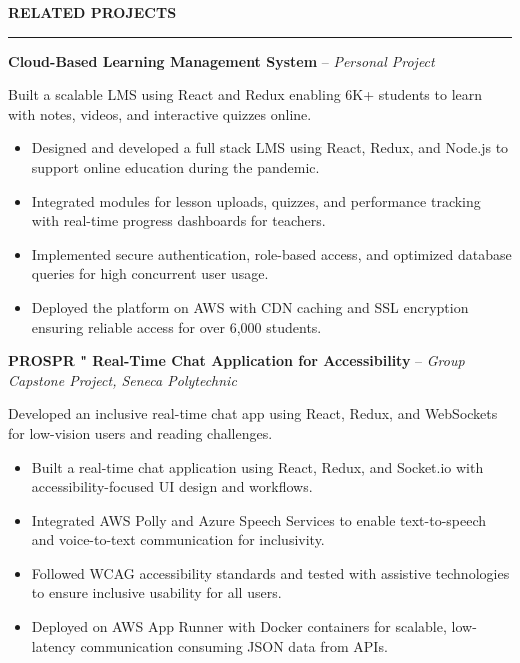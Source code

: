 \documentclass[10pt,letterpaper]{article}
\begin{document}
\vspace{6pt}

\textbf{RELATED PROJECTS}\\[-8pt]
\noindent\rule{\textwidth}{1pt}

\vspace{-2pt}

\textbf{Cloud-Based Learning Management System} -- \emph{Personal Project}

\vspace{-1pt}

Built a scalable LMS using React and Redux enabling 6K+ students to learn with notes, videos, and interactive quizzes online.
\vspace{-1pt}
\begin{itemize}
\item Designed and developed a full stack LMS using React, Redux, and Node.js to support online education during the pandemic.
\item Integrated modules for lesson uploads, quizzes, and performance tracking with real-time progress dashboards for teachers.
\item Implemented secure authentication, role-based access, and optimized database queries for high concurrent user usage.
\item Deployed the platform on AWS with CDN caching and SSL encryption ensuring reliable access for over 6,000 students.
\end{itemize}

\textbf{PROSPR " Real-Time Chat Application for Accessibility} -- \emph{Group Capstone Project, Seneca Polytechnic}

\vspace{-1pt}

Developed an inclusive real-time chat app using React, Redux, and WebSockets for low-vision users and reading challenges.
\vspace{-1pt}
\begin{itemize}
\item Built a real-time chat application using React, Redux, and Socket.io with accessibility-focused UI design and workflows.
\item Integrated AWS Polly and Azure Speech Services to enable text-to-speech and voice-to-text communication for inclusivity.
\item Followed WCAG accessibility standards and tested with assistive technologies to ensure inclusive usability for all users.
\item Deployed on AWS App Runner with Docker containers for scalable, low-latency communication consuming JSON data from APIs.
\end{itemize}
\end{document}
